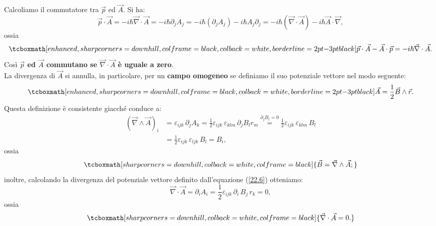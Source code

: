 Calcoliamo il commutatore tra $\vec{p}$ ed $\vec{A}$. Si ha:
	\begin{equation}
		\vec{p}\cdot\vec{A}=-i\hbar \vec{\nabla}\cdot\vec{A}=-i\hbar\partial_{j}A_{j}= -i\hbar(\partial_{j}A_{j})-i\hbar A_{j}\partial_{j}= -i\hbar(\vec{\nabla}\cdot\vec{A})-i\hbar\vec{A}\cdot\vec{\nabla} ,
	\end{equation}
ossia
	\begin{equation}
		\tcboxmath[enhanced, sharp corners=downhill, colframe=black, colback=white, borderline={2pt}{-3pt}{black}]{
			\vec{p}\cdot\vec{A}-\vec{A}\cdot\vec{p}=-i\hbar\vec{\nabla}\cdot\vec{A}.
			}
	\end{equation}
Così \textbf{$\vec{p}$ ed $\vec{A}$ commutano se $\vec{\nabla}\cdot\vec{A}$ è uguale a zero}.\\

La divergenza di $\vec{A}$ si annulla, in particolare, per un \textbf{campo omogeneo} se definiamo il suo potenziale vettore nel modo seguente:
	\begin{equation}
		\tcboxmath[enhanced, sharp corners=downhill, colframe=black, colback=white, borderline={2pt}{-3pt}{black}]{
			\vec{A}=\frac{1}{2}\vec{B}\wedge\vec{r} .
			}
	\label{22.6}
	\end{equation}
Questa definizione è consistente giacché conduce a:
	\begin{align}
		(\vec{\nabla}\wedge\vec{A})_{i}&= \varepsilon_{ijk}\,\partial_{j}A_{k}=\frac{1}{2}\varepsilon_{ijk}\,\varepsilon_{klm}\,\partial_{j}B_{l}r_{m} \overset{\partial_{j}B_{l}=0}{=}  \frac{1}{2}\varepsilon_{ijk}\,\varepsilon_{klm}\,B_{l} \nonumber \\
		&=\frac{1}{2}\varepsilon_{ijk}\,\varepsilon_{ljk}\,B_{l}=B_{i} ,
	\end{align}
ossia
	\begin{equation}
		\tcboxmath[sharp corners=downhill, colback=white, colframe=black]{
			\vec{B}=\vec{\nabla}\wedge\vec{A};
			}
\end{equation}
inoltre, calcolando la divergenza del potenziale vettore definito dall'equazione (\ref{22.6}) otteniamo:
	\begin{equation}
		\vec{\nabla}\cdot\vec{A}=\partial_{i}A_{i}=\frac{1}{2}\varepsilon_{ijk}\, \partial_{i}\, B_{j}\, r_{k}=0 ,
	\end{equation}
ossia 
	\begin{equation}
		\tcboxmath[sharp corners=downhill, colback=white, colframe=black]{
			\vec{\nabla}\cdot\vec{A}=0.
			}
	\end{equation}\\
	
